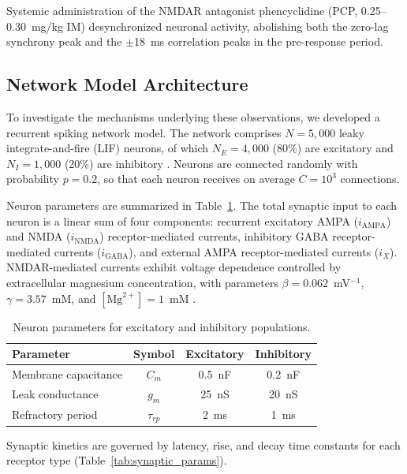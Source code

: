 \documentclass[10pt]{article}
\begin{document}
Systemic administration of the NMDAR antagonist phencyclidine (PCP, 0.25--0.30~mg/kg IM) desynchronized neuronal activity, abolishing both the zero-lag synchrony peak and the $\pm$18~ms correlation peaks in the pre-response period.

\subsection{Network Model Architecture}

To investigate the mechanisms underlying these observations, we developed a recurrent spiking network model. The network comprises $N = 5{,}000$ leaky integrate-and-fire (LIF) neurons, of which $N_E = 4{,}000$ (80\%) are excitatory and $N_I = 1{,}000$ (20\%) are inhibitory \citep{abeles1991corticonics, dayan2001theoretical}. Neurons are connected randomly with probability $p = 0.2$, so that each neuron receives on average $C = 10^3$ connections.

Neuron parameters are summarized in Table~\ref{tab:neuron_params}. The total synaptic input to each neuron is a linear sum of four components: recurrent excitatory AMPA ($i_{\text{AMPA}}$) and NMDA ($i_{\text{NMDA}}$) receptor-mediated currents, inhibitory GABA receptor-mediated currents ($i_{\text{GABA}}$), and external AMPA receptor-mediated currents ($i_X$). NMDAR-mediated currents exhibit voltage dependence controlled by extracellular magnesium concentration, with parameters $\beta = 0.062$~mV$^{-1}$, $\gamma = 3.57$~mM, and $[\text{Mg}^{2+}] = 1$~mM \citep{jahr1990dose}.

\begin{table}[htbp]
\centering
\caption{Neuron parameters for excitatory and inhibitory populations.}
\label{tab:neuron_params}
\begin{tabular}{lccc}
\toprule
Parameter & Symbol & Excitatory & Inhibitory \\
\midrule
Membrane capacitance & $C_m$ & 0.5~nF & 0.2~nF \\
Leak conductance & $g_m$ & 25~nS & 20~nS \\
Refractory period & $\tau_{rp}$ & 2~ms & 1~ms \\
\bottomrule
\end{tabular}
\end{table}

Synaptic kinetics are governed by latency, rise, and decay time constants for each receptor type (Table~\ref{tab:synaptic_params}).
\end{document}
